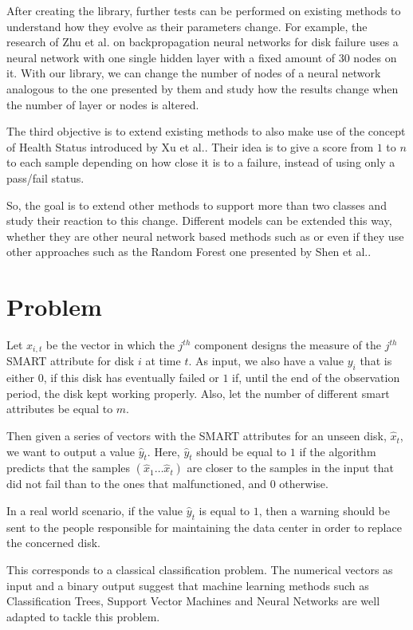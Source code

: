After creating the library, further tests can be performed on existing methods to understand how they evolve as their parameters change.
For example, the research of Zhu et al. on backpropagation neural networks for disk failure\cite{Zhu13} uses a neural network with one single hidden layer with a fixed amount of 30 nodes on it.
With our library, we can change the number of nodes of a neural network analogous to the one presented by them and study how the results change when the number of layer or nodes is altered.

The third objective is to extend existing methods to also make use of the concept of Health Status introduced by Xu et al.\cite{Xu16}.
Their idea is to give a score from $1$ to $n$ to each sample depending on how close it is to a failure, instead of using only a pass/fail status.

So, the goal is to extend other methods to support more than two classes and study their reaction to this change.
Different models can be extended this way, whether they are other neural network based methods such as \cite{Zhu13} or even if they use other approaches such as the Random Forest one presented by Shen et al.\cite{Shen18}.  

\section{Problem}\label{sec:problem}

Let $x_{i,t}$ be the vector in which the $j^{th}$ component designs the measure of the $j^{th}$ SMART attribute for disk $i$ at time $t$.
As input, we also have a value $y_i$ that is either $0$, if this disk has eventually failed or $1$ if, until the end of the observation period, the disk kept working properly.
Also, let the number of different smart attributes be equal to $m$.

Then given a series of vectors with the SMART attributes for an unseen disk, $\hat{x}_t$, we want to output a value $\hat{y}_t$.
Here, $\hat{y}_t$ should be equal to $1$ if the algorithm predicts that the samples $\left(\hat{x}_1\dots\hat{x}_t\right)$ are closer to the samples in the input that did not fail than to the ones that malfunctioned, and $0$ otherwise.

In a real world scenario, if the value $\hat{y}_t$ is equal to $1$, then a warning should be sent to the people responsible for maintaining the data center in order to replace the concerned disk.

This corresponds to a classical classification problem.
The numerical vectors as input and a binary output suggest that machine learning methods such as Classification Trees\cite{Li14}, Support Vector Machines\cite{Zhu13} and Neural Networks\cite{Xu16} are well adapted to tackle this problem.


